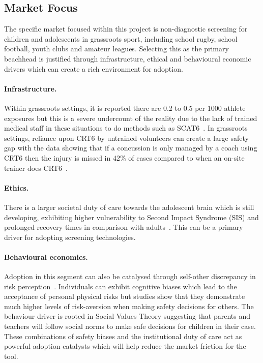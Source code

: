 \subsection{Market Focus}

The specific market focused within this project is non-diagnostic  screening for children and adolescents in grassroots sport, including school rugby, school football, youth clubs and amateur leagues. Selecting this as the primary beachhead is justified through infrastructure, ethical and behavioural economic drivers which can create a rich environment for adoption.

\paragraph{Infrastructure.} Within grassroots settings, it is reported there are 0.2 to 0.5 per 1000 athlete exposures but this is a severe undercount of the reality due to the lack of trained medical staff in these situations to do methods such as SCAT6~\cite{echemendia2023scat6}. In grassroots settings, reliance upon CRT6 by untrained volunteers can create a large safety gap with the data showing that if a concussion is only managed by a coach using CRT6 then the injury is missed in 42\% of cases compared to when an on-site trainer does CRT6~\cite{echemendia2023crt6}.

\paragraph{Ethics.} There is a larger societal duty of care towards the adolescent brain which is still developing, exhibiting higher vulnerability to Second Impact Syndrome (SIS) and prolonged recovery times in comparison with adults~\cite{patricios2023amsterdam}. This can be a primary driver for adopting screening technologies.

\paragraph{Behavioural economics.} Adoption in this segment can also be catalysed through self-other discrepancy in risk perception~\cite{stone2013selfother,dore2014parental}. Individuals can exhibit cognitive biases which lead to the acceptance of personal physical risks but studies show that they demonstrate much higher levels of risk-aversion when making safety decisions for others. The behaviour driver is rooted in Social Values Theory suggesting that parents and teachers will follow social norms to make safe decisions for children in their case. These combinations of safety biases and the institutional duty of care act as powerful adoption catalysts which will help reduce the market friction for the tool.
